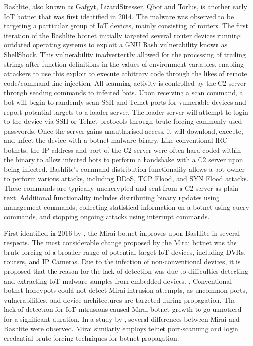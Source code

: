 Bashlite, also known as Gafgyt, LizardStresser, Qbot and Torlus, \citep{NHS2018} is another early IoT botnet that was first identified in 2014. The malware was observed to be targeting a particular group of IoT devices, mainly consisting of routers. The first iteration of the Bashlite botnet initially targeted several router devices running outdated operating systems to exploit a GNU Bash vulnerability known as ShellShock. \citep{Kovacs2014} This vulnerability inadvertently allowed for the processing of trailing strings after function definitions in the values of environment variables, enabling attackers to use this exploit to execute arbitrary code through the likes of remote code/command-line injection. \citep{CVE20146271} All scanning activity is controlled by the C2 server through sending commands to infected bots. \citet{Marzano2018} Upon receiving a scan command, a bot will begin to randomly scan SSH and Telnet ports for vulnerable devices and report potential targets to a loader server. The loader server will attempt to login to the device via SSH or Telnet protocols through brute-forcing commonly used passwords. Once the server gains unauthorised access, it will download, execute, and infect the device with a botnet malware binary. Like conventional IRC botnets, the IP address and port of the C2 server were often hard-coded within the binary to allow infected bots to perform a handshake with a C2 server upon being infected. Bashlite's command distribution functionality allows a bot owner to perform various attacks, including DDoS, TCP Flood, and SYN Flood attacks. These commands are typically unencrypted and sent from a C2 server as plain text. Additional functionality includes distributing binary updates using management commands, collecting statistical information on a botnet using query commands, and stopping ongoing attacks using interrupt commands.

First identified in 2016 by \citet{Malwaremustdie2016}, the Mirai botnet improves upon Bashlite in several respects. \citep{Marzano2018} The most considerable change proposed by the Mirai botnet was the brute-forcing of a broader range of potential target IoT devices, including DVRs, routers, and IP Cameras. Due to the infection of non-conventional devices, it is proposed that the reason for the lack of detection was due to difficulties detecting and extracting IoT malware samples from embedded devices. \citep{Malwaremustdie2016}. Conventional botnet honeypots could not detect Mirai intrusion attempts, as uncommon ports, vulnerabilities, and device architectures are targeted during propagation. The lack of detection for IoT intrusions caused Mirai botnet growth to go unnoticed for a significant duration. In a study by \citet{Marzano2018}, several differences between Mirai and Bashlite were observed. Mirai similarly employs telnet port-scanning and login credential brute-forcing techniques for botnet propagation. 

